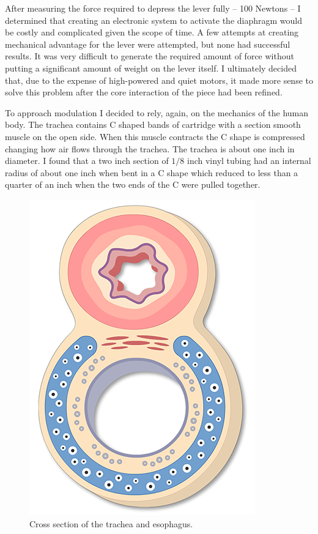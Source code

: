 \documentclass[letterpaper]{article}
\begin{document}
After measuring the force required to depress the lever fully -- 100 Newtons -- I determined that creating an electronic system to activate the diaphragm would be costly and complicated given the scope of time. A few attempts at creating mechanical advantage for the lever were attempted, but none had successful results. It was very difficult to generate the required amount of force without putting a significant amount of weight on the lever itself. I ultimately decided that, due to the expense of high-powered and quiet motors, it made more sense to solve this problem after the core interaction of the piece had been refined. 

To approach modulation I decided to rely, again, on the mechanics of the human body. The trachea contains C shaped bands of cartridge with a section smooth muscle on the open side. When this muscle contracts the C shape is compressed changing how air flows through the trachea. The trachea is about one inch in diameter.\cite{furlow} I found that a two inch section of $1/8$ inch vinyl tubing had an internal radius of about one inch when bent in a C shape which reduced to less than a quarter of an inch when the two ends of the C were pulled together.  

\begin{figure}[h]
\centering
\includegraphics[scale=0.3]{images/trachea.png}
\caption{Cross section of the trachea and esophagus.}
\end{figure}
\end{document}
